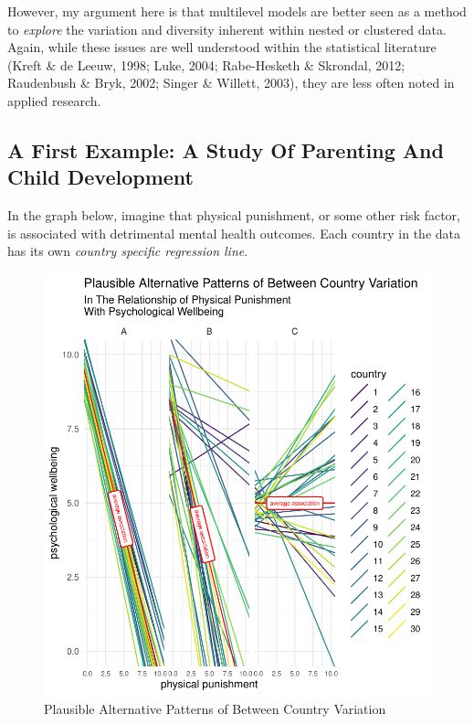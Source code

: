 \documentclass[
  letterpaper,
  DIV=11,
  numbers=noendperiod]{scrreprt}
\begin{document}
However, my argument here is that multilevel models are better seen as a
method to \emph{explore} the variation and diversity inherent within
nested or clustered data. Again, while these issues are well understood
within the statistical literature (Kreft \& de Leeuw, 1998; Luke, 2004;
Rabe-Hesketh \& Skrondal, 2012; Raudenbush \& Bryk, 2002; Singer \&
Willett, 2003), they are less often noted in applied research.

\hypertarget{a-first-example-a-study-of-parenting-and-child-development}{%
\subsection{A First Example: A Study Of Parenting And Child
Development}\label{a-first-example-a-study-of-parenting-and-child-development}}

In the graph below, imagine that physical punishment, or some other risk
factor, is associated with detrimental mental health outcomes. Each
country in the data has its own \emph{country specific regression line}.

\begin{figure}

{\centering \includegraphics{conceptual-framework_files/figure-pdf/fig-variation1-1.pdf}

}

\caption{\label{fig-variation1}Plausible Alternative Patterns of Between
Country Variation}

\end{figure}
\end{document}

